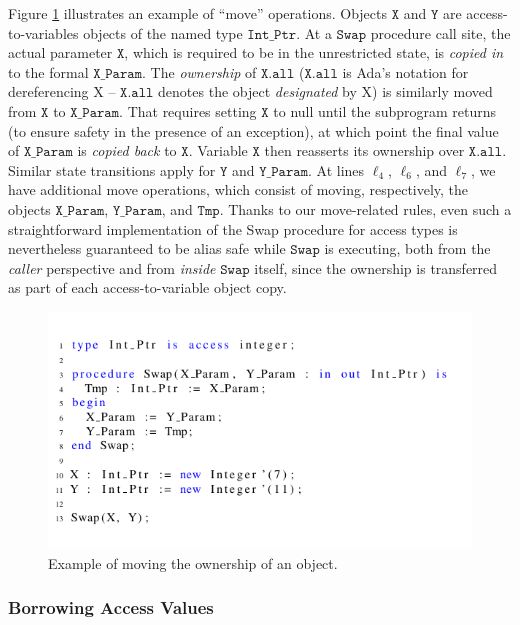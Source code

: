\documentclass{llncs}
\newcommand\var[1]{\ensuremath{\mathtt{#1}}}
\begin{document}
Figure \ref{fig:move_ex1} illustrates an example of ``move'' operations. Objects \var{X} and \var{Y} are access-to-variables objects of the named type \var{Int\_Ptr}. At a \var{Swap} procedure call site,
the actual parameter \var{X}, which is required to be in the unrestricted state, is \textit{copied in} to the formal \var{X\_Param}. The \textit{ownership} of \var{X.all} (\var{X.all} is Ada's notation for dereferencing X -- \var{X.all} denotes the object \textit{designated} by X) is similarly moved from \var{X} to \var{X\_Param}.
That requires setting \var{X} to null until the subprogram returns (to ensure safety in the presence of an exception), at which point the final value of \var{X\_Param} is \textit{copied back} to \var{X}.
Variable \var{X} then reasserts its ownership over \var{X.all}. Similar state transitions apply for \var{Y} and \var{Y\_Param}.  At lines $\ell_4$, $\ell_6$, and $\ell_7$,
we have additional move operations, which consist of moving, respectively, the objects \var{X\_Param}, \var{Y\_Param}, and \var{Tmp}. Thanks to our move-related rules, even such a straightforward
implementation of the Swap procedure for access types is nevertheless guaranteed to be alias safe while \var{Swap} is executing, both from the \textit{caller} perspective and from \textit{inside} \var{Swap} itself, since the ownership is transferred
as part of each access-to-variable object copy. 

\begin{figure}[htb!]
\centering
   \includegraphics[]{move_ex1}
   \caption{Example of moving the ownership of an object.}
   \label{fig:move_ex1}
\end{figure}
 

\subsubsection{Borrowing Access Values}
\label{sec:borrowing}
\end{document}
